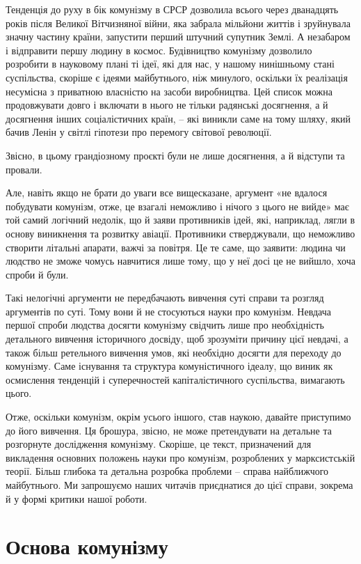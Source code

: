 \documentclass[12pt,a4paper,openany]{book}
\begin{document}
Тенденція до руху в бік комунізму в СРСР дозволила всього через дванадцять років після Великої Вітчизняної війни, яка забрала мільйони життів і зруйнувала значну частину країни, запустити перший штучний супутник Землі. А незабаром і відправити першу людину в космос. Будівництво комунізму дозволило розробити в науковому плані ті ідеї, які для нас, у нашому нинішньому стані суспільства, скоріше є ідеями майбутнього, ніж минулого, оскільки їх реалізація несумісна з приватною власністю на засоби виробництва. Цей список можна продовжувати довго і включати в нього не тільки радянські досягнення, а й досягнення інших соціалістичних країн, – які виникли саме на тому шляху, який бачив Ленін у світлі гіпотези про перемогу світової революції.

Звісно, в цьому грандіозному проєкті були не лише досягнення, а й відступи та провали.

Але, навіть якщо не брати до уваги все вищесказане, аргумент «не вдалося побудувати комунізм, отже, це взагалі неможливо і нічого з цього не вийде» має той самий логічний недолік, що й заяви противників ідей, які, наприклад, лягли в основу виникнення та розвитку авіації. Противники стверджували, що неможливо створити літальні апарати, важчі за повітря. Це те саме, що заявити: людина чи людство не зможе чомусь навчитися лише тому, що у неї досі це не вийшло, хоча спроби й були.

Такі нелогічні аргументи не передбачають вивчення суті справи та розгляд аргументів по суті. Тому вони й не стосуються науки про комунізм. Невдача першої спроби людства досягти комунізму свідчить лише про необхідність детального вивчення історичного досвіду, щоб зрозуміти причину цієї невдачі, а також більш ретельного вивчення умов, які необхідно досягти для переходу до комунізму. Саме існування та структура комуністичного ідеалу, що виник як осмислення тенденцій і суперечностей капіталістичного суспільства, вимагають цього.

Отже, оскільки комунізм, окрім усього іншого, став наукою, давайте приступимо до його вивчення. Ця брошура, звісно, не може претендувати на детальне та розгорнуте дослідження комунізму. Скоріше, це текст, призначений для викладення основних положень науки про комунізм, розроблених у марксистській теорії. Більш глибока та детальна розробка проблеми – справа найближчого майбутнього. Ми запрошуємо наших читачів приєднатися до цієї справи, зокрема й у формі критики нашої роботи.
\ifSubfilesClassLoaded{\setcounter{page}{14}}{}
\section{Основа комунізму}
\label{sec:03_osnovanie}
\end{document}
